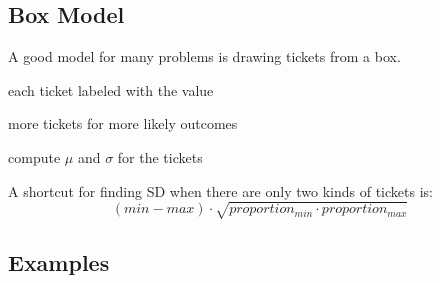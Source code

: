 \documentclass[portrait]{exam}
\begin{document}
  \subsection{Box Model}
  A good model for many problems is drawing tickets from a box.
  \begin{itemize*}
    \item each ticket labeled with the value
    \item more tickets for more likely outcomes
    \item compute $\mu$ and $\sigma$ for the tickets
  \end{itemize*}

  A shortcut for finding SD when there are only two kinds of tickets is:
  \[
    (min - max) \cdot \sqrt{proportion_{min} \cdot proportion_{max}}
  \]

  \subsection{Examples}
\end{document}
